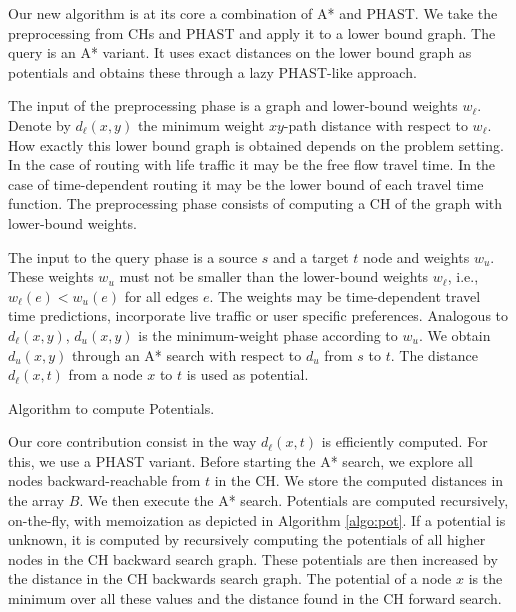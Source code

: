 \documentclass[a4paper,UKenglish,cleveref, autoref]{lipics-v2019}
\begin{document}
Our new algorithm is at its core a combination of A* and PHAST.
We take the preprocessing from CHs and PHAST and apply it to a lower bound graph.
The query is an A* variant.
It uses exact distances on the lower bound graph as potentials and obtains these through a lazy PHAST-like approach.


The input of the preprocessing phase is a graph and lower-bound weights $w_{\ell}$.
Denote by $d_{\ell}(x,y)$ the minimum weight $xy$-path distance with respect to $w_{\ell}$.
How exactly this lower bound graph is obtained depends on the problem setting.
In the case of routing with life traffic it may be the free flow travel time.
In the case of time-dependent routing it may be the lower bound of each travel time function.
The preprocessing phase consists of computing a CH of the graph with lower-bound weights.

The input to the query phase is a source $s$ and a target $t$ node and weights $w_u$.
These weights $w_u$ must not be smaller than the lower-bound weights $w_{\ell}$, i.e., $w_{\ell}(e) < w_u(e)$ for all edges $e$.
The weights may be time-dependent travel time predictions, incorporate live traffic or user specific preferences.
Analogous to $d_{\ell}(x,y)$, $d_u(x,y)$ is the minimum-weight phase according to $w_u$.
We obtain $d_u(x,y)$ through an A* search with respect to $d_u$ from $s$ to $t$.
The distance $d_{\ell}(x,t)$ from a node $x$ to $t$ is used as potential.

\begin{algorithm2e}

\caption{Algorithm to compute Potentials.}
\label{algo:pot}

\end{algorithm2e}

Our core contribution consist in the way $d_{\ell}(x,t)$ is efficiently computed.
For this, we use a PHAST variant.
Before starting the A* search, we explore all nodes backward-reachable from $t$ in the CH.
We store the computed distances in the array $B$.
We then execute the A* search.
Potentials are computed recursively, on-the-fly, with memoization as depicted in Algorithm \ref{algo:pot}.
If a potential is unknown, it is computed by recursively computing the potentials of all higher nodes in the CH backward search graph.
These potentials are then increased by the distance in the CH backwards search graph.
The potential of a node $x$ is the minimum over all these values and the distance found in the CH forward search.
\end{document}

